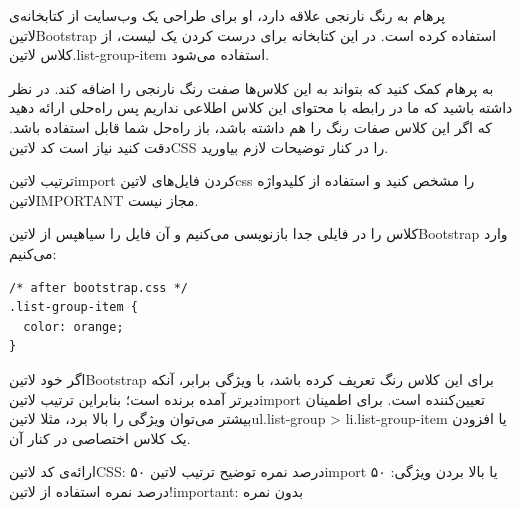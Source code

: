 
پرهام به رنگ نارنجی علاقه دارد، او برای طراحی یک وب‌سایت از کتابخانه‌ی
‌لاتین{Bootstrap}
استفاده کرده است. در این کتابخانه برای درست کردن
یک لیست، از کلاس ‌لاتین{.list-group-item}
استفاده می‌شود.

به پرهام کمک کنید که بتواند به این کلاس‌ها صفت رنگ نارنجی را اضافه کند.
در نظر داشته باشید که ما در رابطه با محتوای این کلاس اطلاعی نداریم
پس راه‌حلی ارائه دهید که اگر این کلاس صفات رنگ را هم داشته باشد، باز راه‌حل شما قابل استفاده باشد.
دقت کنید نیاز است کد ‌لاتین{CSS} را در کنار توضیحات لازم بیاورید.

ترتیب ‌لاتین{import} کردن فایل‌های ‌لاتین{css} را مشخص کنید
و استفاده از کلیدواژه ‌لاتین{IMPORTANT} مجاز نیست.


\begin{پاسخ}

کلاس را در فایلی جدا بازنویسی می‌کنیم و آن فایل را ‌سیاه{پس از} ‌لاتین{Bootstrap} وارد می‌کنیم:

\begin{latin}
\begin{verbatim}
/* after bootstrap.css */
.list-group-item {
  color: orange;
}
\end{verbatim}
\end{latin}

اگر خود ‌لاتین{Bootstrap} برای این کلاس رنگ تعریف کرده باشد، با ویژگی برابر، آنکه دیرتر آمده برنده است؛ بنابراین ترتیب ‌لاتین{import} تعیین‌کننده است.
برای اطمینان بیشتر می‌توان ویژگی را بالا برد، مثلا ‌لاتین{ul.list-group > li.list-group-item} یا افزودن یک کلاس اختصاصی در کنار آن.

 ارائه‌ی کد ‌لاتین{CSS}: ۵۰ درصد نمره
 توضیح ترتیب ‌لاتین{import} یا بالا بردن ویژگی: ۵۰ درصد نمره
 استفاده از ‌لاتین{!important}: بدون نمره

\end{پاسخ}
